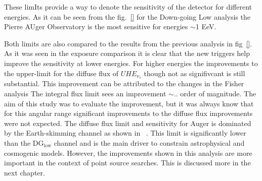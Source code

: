 These limIts provide a way to denote the sensitivity of the detector for different energies. As it can be seen from the fig.~\ref{} for the Down-going Low analysis the Pierre AUger Observatory is the most sensitive for energies $\sim$1 EeV. 

Both limits are also compared to the results from the previous analysis in fig~\ref{}. As it was seen in the exposure comparison it is clear that the new triggers help improve the sensitivity at lower energies. For higher energies the improvements to the upper-limit for the diffuse flux of $UHE_{\nu_s}$ though not as signifivcant is still substantial. This improvement can be attributed to the changes in the Fisher analysis The integral flux limit sees an improvement $\sim$.. order of magnitude. The aim of this study was to evaluate the improvement, but it was always know that for this angular range significant improvements to the diffuse flux improvements were not expected. The diffuse flux limit and sensitivity for Auger is dominated by the Earth-skimming channel as shown in ~\cite{Aab_2019_diffuse}. This limit is significantly lower than the DG$\mathrm{_{low}}$ channel and is the main driver to constrain astrophysical and cosmogenic models. However, the improvements shown in this analysis are more important in the context of point source searches. This is discussed more in the next chapter. 




